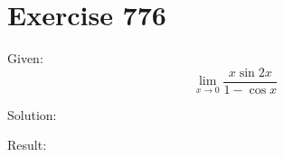 \documentclass[a4paper, 10pt]{scrartcl}
\begin{document}
\section{Exercise 776}

Given:
\[
\lim_{x\to 0}{\frac{x\sin{2x}}{1 - \cos{x}}}
\]

Solution:

Result:
\end{document}
